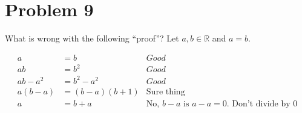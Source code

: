 \documentclass[english,10pt,a4paper]{article}
\begin{document}
\section*{Problem 9}
What is wrong with the following “proof”? 
Let $a, b \in \mathbb{R}$ and $a=b$.

\begin{align}
a &=b &  Good\\
ab&=b^2 & Good\\
ab-a^2 &= b^2-a^2 &Good \\
a(b-a) &= (b-a)(b+1) & \text{Sure thing}\\
a &= b+a & \text{No, }b-a\text{ is }a-a = 0. \text{ Don't divide by 0}
\end{align}
\end{document}
